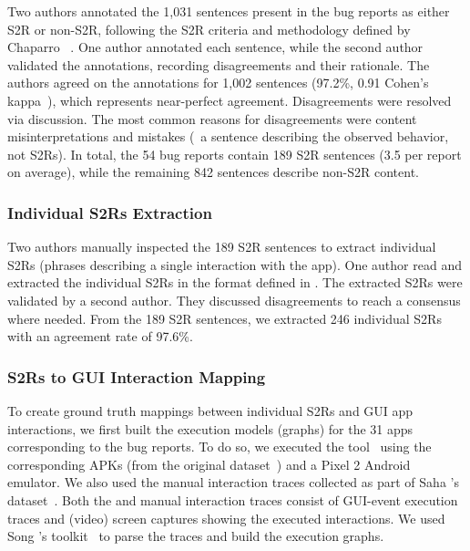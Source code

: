 Two authors annotated the 1,031 sentences present in the bug reports as either S2R or non-S2R, following the S2R criteria and methodology defined by Chaparro \etal~\cite{Chaparro2017}. 
One author annotated each sentence, while the second author validated the annotations, recording disagreements and their rationale. 
The authors agreed on the annotations for 1,002 sentences (97.2\%, 0.91 Cohen's kappa~\cite{Cohen}), which represents near-perfect agreement. 
Disagreements were resolved via discussion. 
The most common reasons for disagreements were content misinterpretations and mistakes (\eg\ a sentence describing the observed behavior, not S2Rs). 
In total, the 54 bug reports contain 189 S2R sentences (3.5 per report on average), while the remaining 842 sentences describe non-S2R content.

\subsubsection{Individual S2Rs Extraction}
\label{sec:extraction_data_dev}
Two authors manually inspected the 189 S2R sentences to extract individual S2Rs (phrases describing a single interaction with the app). 
One author read and extracted the individual S2Rs in the format defined in . 
The extracted S2Rs were validated by a second author. 
They discussed disagreements to reach a consensus where needed. 
From the 189 S2R sentences, we extracted 246 individual S2Rs with an agreement rate of 97.6\%. 

\subsubsection{S2Rs to GUI Interaction Mapping}
\label{sec:qa_data_dev}

To create ground truth mappings between individual S2Rs and GUI app interactions, we first built the execution models (\ie graphs) for the 31 apps corresponding to the bug reports. 
To do so, we executed the \CrashScope tool~\cite{Moran2016} using the corresponding APKs (from the original dataset~\cite{saha2024toward,Johnson2022}) and a Pixel 2 Android emulator. 
We also used the manual interaction traces collected as part of Saha \etal's dataset~\cite{saha2024toward}. Both the \CrashScope and manual interaction traces consist of GUI-event execution traces and (video) screen captures showing the executed interactions. 
We used Song \etal's toolkit~\cite{song2022burt} to parse the traces and build the execution graphs.

